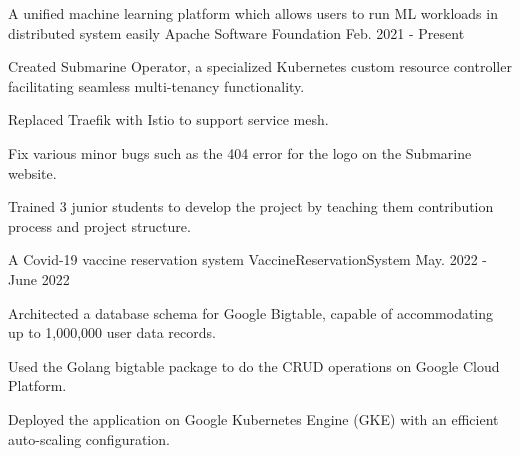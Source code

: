 

\begin{cventries}

  \cventry
  {A unified machine learning platform which allows users to run ML workloads in distributed system easily}
  {Apache Software Foundation \href{https://github.com/apache/submarine}{\color{red}{[GitHub Link]}}} %
  {}
  {Feb. 2021 - Present} %
  {
    \begin{cvitems} %
      \item {Created Submarine Operator, a specialized Kubernetes custom resource controller facilitating seamless multi-tenancy functionality.}
      \item {Replaced Traefik with Istio to support service mesh.}
      \item {Fix various minor bugs such as the 404 error for the logo on the Submarine website.}
      \item {Trained 3 junior students to develop the project by teaching them contribution process and project structure.}
    \end{cvitems}
  }

  \cventry
  {A Covid-19 vaccine reservation system}
  {VaccineReservationSystem \href{https://github.com/MortalHappiness/VaccineReservationSystem}{\color{red}{[GitHub Link]}}}
  {}
  {May. 2022 - June 2022} %
  {
    \begin{cvitems} %
      \item {Architected a database schema for Google Bigtable, capable of accommodating up to 1,000,000 user data records.}
      \item {Used the Golang bigtable package to do the CRUD operations on Google Cloud Platform.}
      \item {Deployed the application on Google Kubernetes Engine (GKE) with an efficient auto-scaling configuration.}
    \end{cvitems}
  }


\end{cventries}
